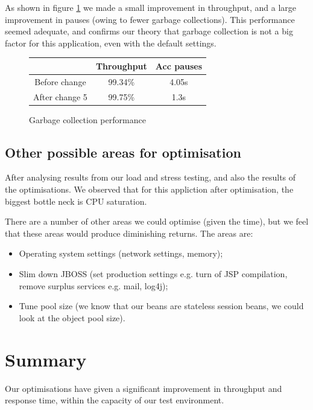 As shown in figure \ref{gc_performance} we made a small improvement in throughput, and a large improvement in pauses (owing to fewer garbage collections). This performance seemed adequate, and confirms our theory that garbage collection is not a big factor for this application, even with the default settings.

\begin{figure}[h]
 \centering
\begin{tabular}{| c | c | c |}
 \hline
  & Throughput & Acc pauses\\
 \hline
 Before change & 99.34\% & 4.05s \\
 After change 5 & 99.75\% & 1.3s \\
 \hline
\end{tabular}
 \caption{Garbage collection performance}
 \label{gc_performance}
\end{figure}

\subsection*{Other possible areas for optimisation}

After analysing results from our load and stress testing, and also the results of the optimisations. We observed that for this appliction after optimisation, the biggest bottle neck is CPU saturation. 

There are a number of other areas we could optimise (given the time), but we feel that these areas would produce diminishing returns. The areas are:

\begin{itemize}
 \item Operating system settings (network settings, memory);
 \item Slim down JBOSS (set production settings e.g. turn of JSP compilation, remove surplus services e.g. mail, log4j);
 \item Tune pool size (we know that our beans are stateless session beans, we could look at the object pool size).
\end{itemize}

\section{Summary}

Our optimisations have given a significant improvement in throughput and response time, within the capacity of our test environment. 
